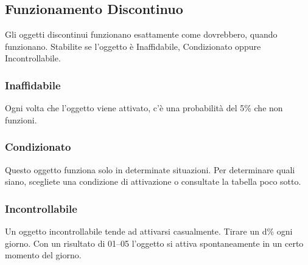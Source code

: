 \begin{multicols}{2}
\subsection{Funzionamento Discontinuo}

Gli oggetti discontinui funzionano esattamente come dovrebbero, quando funzionano. Stabilite se l'oggetto è Inaffidabile, Condizionato oppure Incontrollabile.

\medskip
\subsubsection{Inaffidabile}

Ogni volta che l'oggetto viene attivato, c'è una probabilità del 5\% che non funzioni.

\subsubsection{Condizionato}

Questo oggetto funziona solo in determinate situazioni. Per determinare quali siano, scegliete una condizione di attivazione o consultate la tabella poco sotto.

\subsubsection{Incontrollabile}

Un oggetto incontrollabile tende ad attivarsi casualmente. Tirare un d\% ogni giorno. Con un risultato di 01--05 l'oggetto si attiva spontaneamente in un certo momento del giorno.

\medskip


\end{multicols}
